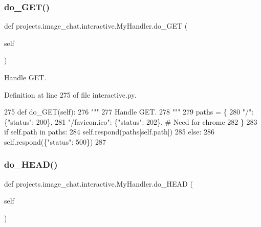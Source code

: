 \subsubsection{\texorpdfstring{do\+\_\+\+G\+E\+T()}{do\_GET()}}
{\footnotesize\ttfamily def projects.\+image\+\_\+chat.\+interactive.\+My\+Handler.\+do\+\_\+\+G\+ET (\begin{DoxyParamCaption}\item[{}]{self }\end{DoxyParamCaption})}

\begin{DoxyVerb}Handle GET.
\end{DoxyVerb}
 

Definition at line 275 of file interactive.\+py.


\begin{DoxyCode}
275     \textcolor{keyword}{def }do\_GET(self):
276         \textcolor{stringliteral}{"""}
277 \textcolor{stringliteral}{        Handle GET.}
278 \textcolor{stringliteral}{        """}
279         paths = \{
280             \textcolor{stringliteral}{"/"}: \{\textcolor{stringliteral}{"status"}: 200\},
281             \textcolor{stringliteral}{"/favicon.ico"}: \{\textcolor{stringliteral}{"status"}: 202\},  \textcolor{comment}{# Need for chrome}
282         \}
283         \textcolor{keywordflow}{if} self.path \textcolor{keywordflow}{in} paths:
284             self.respond(paths[self.path])
285         \textcolor{keywordflow}{else}:
286             self.respond(\{\textcolor{stringliteral}{"status"}: 500\})
287 
\end{DoxyCode}
\mbox{\label{classprojects_1_1image__chat_1_1interactive_1_1MyHandler_a40845d6fbb9eed68138c9ae1c52d1344}} 
\subsubsection{\texorpdfstring{do\+\_\+\+H\+E\+A\+D()}{do\_HEAD()}}
{\footnotesize\ttfamily def projects.\+image\+\_\+chat.\+interactive.\+My\+Handler.\+do\+\_\+\+H\+E\+AD (\begin{DoxyParamCaption}\item[{}]{self }\end{DoxyParamCaption})}

